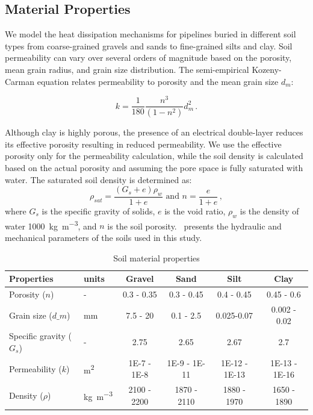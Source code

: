 \documentclass[Journal,letterpaper,InsideFigs]{ascelike-new}
\begin{document}
\subsection*{Material Properties}
We model the heat dissipation mechanisms for pipelines buried in different soil types from coarse-grained gravels and sands to fine-grained silts and clay. Soil permeability can vary over several orders of magnitude based on the porosity, mean grain radius, and grain size distribution. The semi-empirical Kozeny-Carman equation relates permeability to porosity and the mean grain size $d_m$:

\begin{equation}
k = \frac{1}{180} \frac{n^3}{(1-n^2)} d_m^2\,.
\end{equation}

Although clay is highly porous, the presence of an electrical double-layer reduces its effective porosity resulting in reduced permeability. We use the effective porosity only for the permeability calculation, while the soil density is calculated based on the actual porosity and assuming the pore space is fully saturated with water. The saturated soil density is determined as:
\begin{equation}
 \rho_{sat} = \frac{(G_s + e) \rho_w}{1+e} \text{ and } n = \frac{e}{1+e}\,,   
\end{equation}
where $G_s$ is the specific gravity of solids, $e$ is the void ratio, $\rho_w$ is the density of water \SI{1000}{\kilogram\per\meter\cubed}, and $n$ is the soil porosity.~ presents the hydraulic and mechanical parameters of the soils used in this study. 

\begin{table}[htpb]
\caption{Soil material properties}
\label{tab:soil}
\begin{tabular}{llcccc}
\toprule
\textbf{Properties}           &   \textbf{units}                      & \textbf{Gravel} & \textbf{Sand} & \textbf{Silt} & \textbf{Clay} \\
\midrule
Porosity ($n$)                  & -                       & 0.3 - 0.35      & 0.3 - 0.45    & 0.4 - 0.45    & 0.45 - 0.6    \\
Grain size ($d\_m$)             & \si{\milli\meter}                      & 7.5 - 20        & 0.1 - 2.5     & 0.025-0.07    & 0.002 - 0.02  \\
Specific gravity ($G_s$)         & -                       & 2.75            & 2.65          & 2.67          & 2.7           \\
Permeability ($k$)              & \si{\meter\squared}    & 1E-7 - 1E-8     & 1E-9 - 1E-11  & 1E-12 - 1E-13 & 1E-13 - 1E-16 \\
Density ($\rho$) & \si{\kilo\gram\per\meter\cubed} & 2100 - 2200     & 1870 - 2110   & 1880 - 1970   & 1650 - 1890  \\
\bottomrule
\end{tabular}
\end{table}
\end{document}
